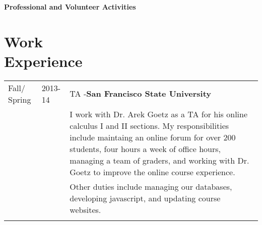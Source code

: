 \documentclass[margin,line,pifont,palatino,courier]{res}
\newenvironment{list2}{
  \begin{list}{$\bullet$}{%
      \setlength{\itemsep}{0in}
      \setlength{\parsep}{0in} \setlength{\parskip}{0in}
      \setlength{\topsep}{0in} \setlength{\partopsep}{0in}
      \setlength{\leftmargin}{0.2in}}}{\end{list}}
\begin{document}
\begin{resume}
%
%
%
% 
% 
% 
% 
%


\newpage

{\bf \Large Professional and Volunteer Activities}\\

\section{\bf  Work\\ Experience}

\begin{tabular}{@{}p{0.75in}p{0.5in}p{4in}}
 Fall/ Spring & 2013-14  & TA -{\bf San Francisco State University }  \\	
 					& & I work with Dr. Arek Goetz as a TA for his online calculus I and II sections.  
					My responsibilities include maintaing an online forum for over 200 students, four hours a week of office hours, managing
					a team of graders, and working with Dr. Goetz to improve the online course experience.  \\ 
			&&		Other duties include managing our databases, developing javascript, and updating course websites.   \\ \\


\end{tabular}
\end{resume}
\end{document}

